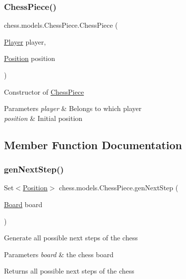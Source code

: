 \subsubsection{\texorpdfstring{Chess\+Piece()}{ChessPiece()}}
{\footnotesize\ttfamily chess.\+models.\+Chess\+Piece.\+Chess\+Piece (\begin{DoxyParamCaption}\item[{\mbox{\hyperlink{enumchess_1_1models_1_1enums_1_1_player}{Player}}}]{player,  }\item[{\mbox{\hyperlink{classchess_1_1models_1_1_position}{Position}}}]{position }\end{DoxyParamCaption})}

Constructor of \mbox{\hyperlink{classchess_1_1models_1_1_chess_piece}{Chess\+Piece}}


\begin{DoxyParams}{Parameters}
{\em player} & Belongs to which player \\
\hline
{\em position} & Initial position \\
\hline
\end{DoxyParams}


\subsection{Member Function Documentation}
\mbox{\label{classchess_1_1models_1_1_chess_piece_afd359313e83bdef860f9f8236435522f}} 
\subsubsection{\texorpdfstring{gen\+Next\+Step()}{genNextStep()}}
{\footnotesize\ttfamily Set$<$\mbox{\hyperlink{classchess_1_1models_1_1_position}{Position}}$>$ chess.\+models.\+Chess\+Piece.\+gen\+Next\+Step (\begin{DoxyParamCaption}\item[{\mbox{\hyperlink{classchess_1_1models_1_1_board}{Board}}}]{board }\end{DoxyParamCaption})}

Generate all possible next steps of the chess


\begin{DoxyParams}{Parameters}
{\em board} & the chess board \\
\hline
\end{DoxyParams}
\begin{DoxyReturn}{Returns}
all possible next steps of the chess 
\end{DoxyReturn}
\mbox{\label{classchess_1_1models_1_1_chess_piece_aaa3cef5d52e4a228dc01f91133a6c437}} 
